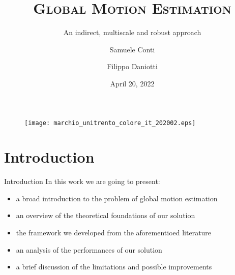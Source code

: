 \documentclass[aspectratio=1610,xcolor=dvipsnames]{beamer}
\author[Conti \and Daniotti]{Samuele Conti \and Filippo Daniotti}
\title[Global Motion Estimation]{\textsc{Global Motion Estimation}}
\subtitle{An indirect, multiscale and robust approach}
\institute[DISI - UniTN]{Department of Information Engineering\\and Computer Science}
\date{April 20, 2022}
\begin{document}
\begin{frame}
    \titlepage
    \begin{figure}[H]
        \begin{center}
            \texttt{[image: marchio\_unitrento\_colore\_it\_202002.eps]}
        \end{center}
    \end{figure}
\end{frame}

\begin{frame}
    \tableofcontents[sectionstyle=show,subsectionstyle=show/shaded/hide,subsubsectionstyle=show/shaded/hide]
\end{frame}

\section{Introduction}
\begin{frame}{Introduction}
    In this work we are going to present:
    \begin{itemize}
        \item a broad introduction to the problem of global motion estimation
        \item an overview of the theoretical foundations of our solution
        \item the framework we developed from the aforementioed literature
        \item an analysis of the performances of our solution 
        \item a brief discussion of the limitations and possible improvements
    \end{itemize}
\end{frame}
\end{document}

